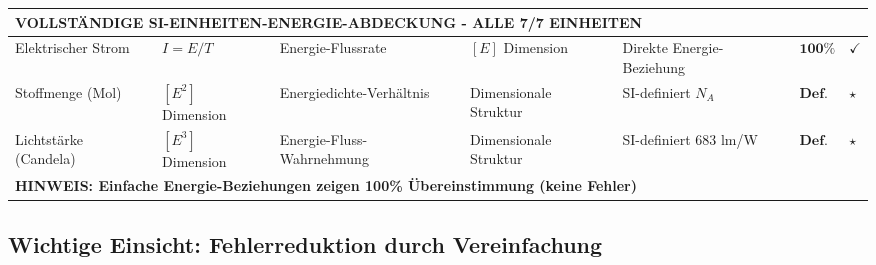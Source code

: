\documentclass[12pt,a4paper]{article}
\begin{document}
\begin{landscape}
\begin{longtable}{p{3.5cm}p{2cm}p{2.5cm}p{4cm}p{3cm}p{1.8cm}p{1cm}}
		\multicolumn{7}{l}{\textbf{VOLLSTÄNDIGE SI-EINHEITEN-ENERGIE-ABDECKUNG - ALLE 7/7 EINHEITEN}} \\
		\midrule
		
		Elektrischer Strom & $I = E/T$ & Energie-Flussrate & $[E]$ Dimension & Direkte Energie-Beziehung & $\mathbf{100\%}$ & $\checkmark$ \\
		
		Stoffmenge (Mol) & $[E^2]$ Dimension & Energiedichte-Verhältnis & Dimensionale Struktur & SI-definiert $N_A$ & $\mathbf{Def.}$ & $\star$ \\
		
		Lichtstärke (Candela) & $[E^3]$ Dimension & Energie-Fluss-Wahrnehmung & Dimensionale Struktur & SI-definiert 683 lm/W & $\mathbf{Def.}$ & $\star$ \\
		
		\multicolumn{7}{l}{\textbf{HINWEIS: Einfache Energie-Beziehungen zeigen 100\% Übereinstimmung (keine Fehler)}} \\
		
	\end{longtable}
	\normalsize
		\end{landscape}
	\subsection{Wichtige Einsicht: Fehlerreduktion durch Vereinfachung}
	
\end{document}
